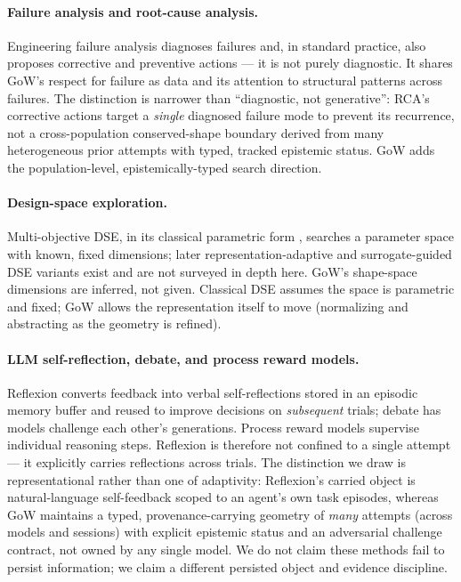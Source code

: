 \documentclass[11pt]{article}
\theoremstyle{gowthm}
\theoremstyle{gowplain}
\begin{document}
\paragraph{Failure analysis and root-cause analysis.}
Engineering failure analysis \citep{anderson2005root} diagnoses failures and,
in standard practice, also proposes corrective and preventive actions ---
it is not purely diagnostic. It shares GoW's respect for failure as data and its
attention to structural patterns across failures. The distinction is narrower than
``diagnostic, not generative'': RCA's corrective actions target a
\emph{single} diagnosed failure mode to prevent its recurrence, not a
cross-population conserved-shape boundary derived from many heterogeneous
prior attempts with typed, tracked epistemic status. GoW adds the
population-level, epistemically-typed search direction.

\paragraph{Design-space exploration.}
Multi-objective DSE, in its classical parametric form
\citep{palermo2005dse}, searches a parameter space with
known, fixed dimensions; later representation-adaptive and surrogate-guided DSE
variants exist and are not surveyed in depth here. GoW's shape-space dimensions are inferred, not given. Classical DSE
assumes the space is parametric and fixed; GoW allows the representation itself
to move (normalizing and abstracting as the geometry is refined).

\paragraph{LLM self-reflection, debate, and process reward models.}
Reflexion \citep{shinn2023reflexion} converts feedback into verbal
self-reflections stored in an episodic memory buffer and reused to improve
decisions on \emph{subsequent} trials; debate \citep{irving2018debate} has models
challenge each other's generations. Process reward models
\citep{lightman2023process} supervise individual reasoning steps. Reflexion is
therefore not confined to a single attempt --- it explicitly carries reflections
across trials. The distinction we draw is representational rather than one of
adaptivity: Reflexion's carried object is natural-language self-feedback scoped
to an agent's own task episodes, whereas GoW maintains a typed, provenance-carrying
geometry of \emph{many} attempts (across models and sessions) with explicit
epistemic status and an adversarial challenge contract, not owned by any single
model. We do not claim these methods fail to persist information; we claim a
different persisted object and evidence discipline.
\end{document}
